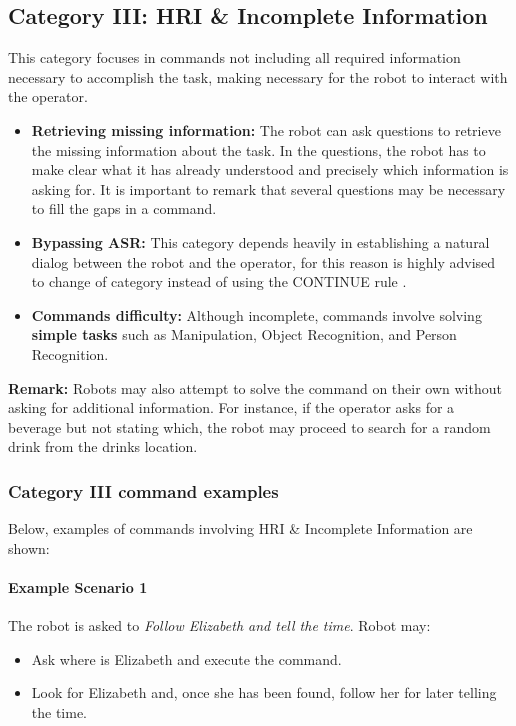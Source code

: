 %
%
\subsection{Category III: HRI \& Incomplete Information}
\label{sec:eegpsr-categoryIII-explained}
This category focuses in commands not including all required information necessary to accomplish the task, making necessary for the robot to interact with the operator.

\begin{itemize}
	\item \textbf{Retrieving missing information:} The robot can ask questions to retrieve the missing information about the task. In the questions, the robot has to make clear what it has already understood and precisely which information is asking for. It is important to remark that several questions may be necessary to fill the gaps in a command.

	\item \textbf{Bypassing ASR:} This category depends heavily in establishing a natural dialog between the robot and the operator, for this reason is highly advised to change of category instead of using the CONTINUE rule .

	\item \textbf{Commands difficulty:} Although incomplete, commands involve solving \textbf{simple tasks} such as Manipulation, Object Recognition, and Person Recognition.

\end{itemize}

\textbf{Remark:} Robots may also attempt to solve the command on their own without asking for additional information. For instance, if the operator asks for a beverage but not stating which, the robot may proceed to search for a random drink from the drinks location.

\subsubsection{Category III command examples}
Below, examples of commands involving HRI \& Incomplete Information are shown:

\paragraph{Example Scenario 1}
The robot is asked to \textit{Follow Elizabeth and tell the time}. Robot may:
\begin{itemize}
	\item Ask where is Elizabeth and execute the command.
	\item Look for Elizabeth and, once she has been found, follow her for later telling the time.
\end{itemize}

